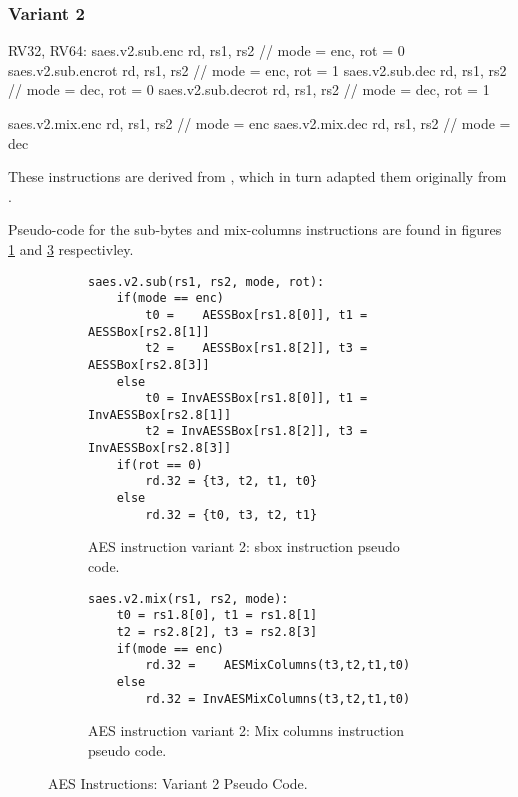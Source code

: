 \subsubsection{Variant 2}

\begin{cryptoisa}
RV32, RV64:
    saes.v2.sub.enc    rd, rs1, rs2 // mode = enc, rot = 0
    saes.v2.sub.encrot rd, rs1, rs2 // mode = enc, rot = 1
    saes.v2.sub.dec    rd, rs1, rs2 // mode = dec, rot = 0
    saes.v2.sub.decrot rd, rs1, rs2 // mode = dec, rot = 1

    saes.v2.mix.enc    rd, rs1, rs2 // mode = enc
    saes.v2.mix.dec    rd, rs1, rs2 // mode = dec
\end{cryptoisa}

These instructions are derived from \cite{MPP:19}, which in turn adapted
them originally from \cite{TG:06}.

Pseudo-code for the sub-bytes and mix-columns instructions are found in
figures
\ref{fig:pesudo:aes:v2:sub}
and
\ref{fig:pesudo:aes:v2:mix}
respectivley.

\begin{figure}
\begin{subfigure}[b]{1.0\textwidth}
\begin{lstlisting}
saes.v2.sub(rs1, rs2, mode, rot):
    if(mode == enc)
        t0 =    AESSBox[rs1.8[0]], t1 =    AESSBox[rs2.8[1]]
        t2 =    AESSBox[rs1.8[2]], t3 =    AESSBox[rs2.8[3]]
    else
        t0 = InvAESSBox[rs1.8[0]], t1 = InvAESSBox[rs2.8[1]]
        t2 = InvAESSBox[rs1.8[2]], t3 = InvAESSBox[rs2.8[3]]
    if(rot == 0)
        rd.32 = {t3, t2, t1, t0} 
    else
        rd.32 = {t0, t3, t2, t1}
\end{lstlisting}
\caption{AES instruction variant 2: sbox instruction pseudo code.}
\label{fig:pesudo:aes:v2:sub}
\end{subfigure}
\begin{subfigure}[b]{1.0\textwidth}
\begin{lstlisting}
saes.v2.mix(rs1, rs2, mode):
    t0 = rs1.8[0], t1 = rs1.8[1]
    t2 = rs2.8[2], t3 = rs2.8[3]
    if(mode == enc)
        rd.32 =    AESMixColumns(t3,t2,t1,t0)
    else
        rd.32 = InvAESMixColumns(t3,t2,t1,t0)
\end{lstlisting}
\caption{AES instruction variant 2: Mix columns instruction pseudo code.}
\label{fig:pesudo:aes:v2:mix}
\end{subfigure}
\caption{AES Instructions: Variant 2 Pseudo Code.}
\end{figure}

